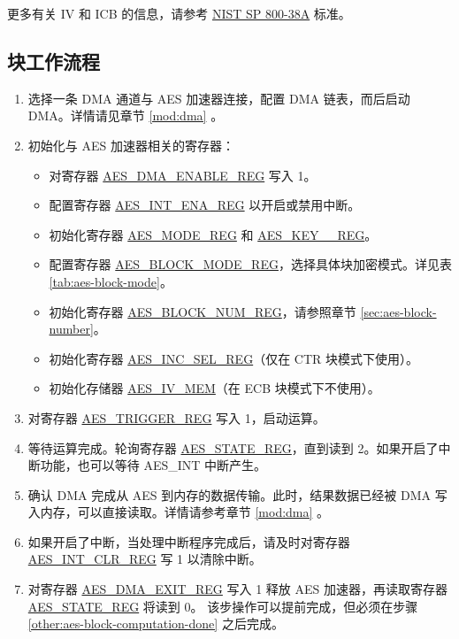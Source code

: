 \documentclass[main\_\_CN.tex]{subfiles}
\begin{document}
更多有关 IV 和 ICB 的信息，请参考 \href{https://nvlpubs.nist.gov/nistpubs/Legacy/SP/nistspecialpublication800-38a.pdf}{NIST SP 800-38A} 标准。

\subsection{块工作流程}

\begin{enumerate}
    \item 选择一条 DMA 通道与 AES 加速器连接，配置 DMA 链表，而后启动 DMA。详情请见章节 \ref{mod:dma} \textit{}。
    \item 初始化与 AES 加速器相关的寄存器：
    \begin{itemize}
        \item 对寄存器 \hyperref[regdesc:AESDMAENABLEREG]{AES\_DMA\_ENABLE\_REG} 写入 1。
        \item 配置寄存器 \hyperref[regdesc:AESINTENAREG]{AES\_INT\_ENA\_REG} 以开启或禁用中断。
        \item 初始化寄存器 \hyperref[regdesc:AESMODEREG]{AES\_MODE\_REG} 和 \hyperref[regdesc:AESKEYnREG]{AES\_KEY\_\_REG}。
        \item 配置寄存器 \hyperref[regdesc:AESBLOCKMODEREG]{AES\_BLOCK\_MODE\_REG}，选择具体块加密模式。详见表 \ref{tab:aes-block-mode}。
        \item 初始化寄存器 \hyperref[regdesc:AESBLOCKNUMREG]{AES\_BLOCK\_NUM\_REG}，请参照章节 \ref{sec:aes-block-number}。
        \item 初始化寄存器 \hyperref[regdesc:AESINCSELREG]{AES\_INC\_SEL\_REG}（仅在 CTR 块模式下使用）。
        \item 初始化存储器 \hyperref[memdesc:AESIVMEM]{AES\_IV\_MEM}（在 ECB 块模式下不使用）。
    \end{itemize}
    \item 对寄存器 \hyperref[regdesc:AESTRIGGERREG]{AES\_TRIGGER\_REG} 写入 1，启动运算。
    \item \label{other:aes-block-computation-done} 等待运算完成。轮询寄存器 \hyperref[regdesc:AESSTATEREG]{AES\_STATE\_REG}，直到读到 2。如果开启了中断功能，也可以等待 AES\_INT 中断产生。
    \item 确认 DMA 完成从 AES 到内存的数据传输。此时，结果数据已经被 DMA 写入内存，可以直接读取。详情请参考章节 \ref{mod:dma} \textit{}。
    \item 如果开启了中断，当处理中断程序完成后，请及时对寄存器 \hyperref[regdesc:AESINTCLRREG]{AES\_INT\_CLR\_REG} 写 1 以清除中断。
    \item 对寄存器 \hyperref[regdesc:AESDMAEXITREG]{AES\_DMA\_EXIT\_REG} 写入 1 释放 AES 加速器，再读取寄存器 \hyperref[regdesc:AESSTATEREG]{AES\_STATE\_REG} 将读到 0。
    该步操作可以提前完成，但必须在步骤 \ref{other:aes-block-computation-done} 之后完成。
\end{enumerate}
\end{document}
